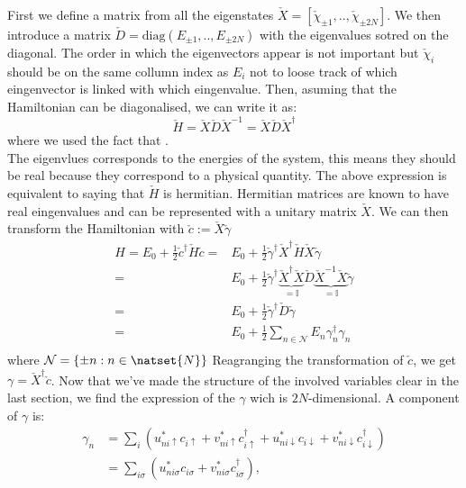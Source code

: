 \documentclass[../main.tex]{subfile}
\begin{document}
First we define a matrix from all the eigenstates $\check{X} = [\check{\chi}_{\pm 1},..,\check{\chi}_{\pm 2N}]$.
We then introduce a matrix $\check{D} = \text{diag}(E_{\pm 1},..,E_{\pm 2N})$ with the eigenvalues sotred on the diagonal. The order in which the eigenvectors appear is not important
but $\check{\chi}_{i}$ should be on the same collumn index as $E_{i}$ not to loose track of which eingenvector is linked with which eingenvalue.
Then, asuming that the Hamiltonian can be diagonalised, we can write it as:
\begin{equation}\label{eq:Diag_Ham}
    \check{H} = \check{X}\check{D}\check{X}^{-1} = \check{X}\check{D}\check{X}^{\dagger} 
\end{equation}
where we used the fact that .\\
The eigenvlues corresponds to the energies of the system, this means they should be real because they correspond to a physical quantity. The above expression
is equivalent to saying that $\check{H}$ is hermitian. Hermitian matrices are known to have real eingenvalues and can be represented with a unitary matrix $\check{X}$.  
We can then transform the Hamiltonian with $\check{c} := \check{X}\check{\gamma}$
\begin{align*}
    H = E_0 + \frac{1}{2}\check{c}^{\dagger}\check{H}\check{c} =& E_0 + \frac{1}{2}\check{\gamma}^{\dagger}\check{X}^{\dagger}\check{H}\check{X}\check{\gamma}\\
    =& E_0 +\frac{1}{2}\check{\gamma}^{\dagger}\underbrace{\check{X}^{\dagger} \check{X}}_{=\mathbb{I}}\check{D}\underbrace{\check{X}^{-1}\check{X}}_{=\mathbb{I}}\check{\gamma}\\
    =& E_0 + \frac{1}{2}\check{\gamma}^{\dagger}\check{D}\check{\gamma}\\
    =& E_0 + \frac{1}{2}\sum_{n\in\mathcal{N}}E_n \gamma_n^{\dagger}\gamma_n\\
\end{align*}
where $\mathcal{N}= \{\pm n : n \in \natset{N}\}$
Reagranging the transformation of $\check{c}$, we get $\gamma = \check{X}^{\dagger}\check{c}$.   
Now that we've made the structure of the involved variables clear in the last section, we find the expression of the $\gamma$ wich is $2N$-dimensional. A component of $\gamma$ is:
\begin{align*}
    \gamma_n &= \sum_{i} \left( u_{ni\uparrow}^{\ast}c_{i\uparrow}+ v_{ni\uparrow}^{\ast}c_{i\uparrow}^{\dagger} +  u_{ni\downarrow}^{\ast}c_{i\downarrow}+ v_{ni\downarrow}^{\ast}c_{i\downarrow}^{\dagger}\right)\\
        &=  \sum_{i\sigma} \left( u_{ni\sigma}^{\ast}c_{i\sigma}+ v_{ni\sigma}^{\ast}c_{i\sigma}^{\dagger}\right),
\end{align*}
\end{document}
